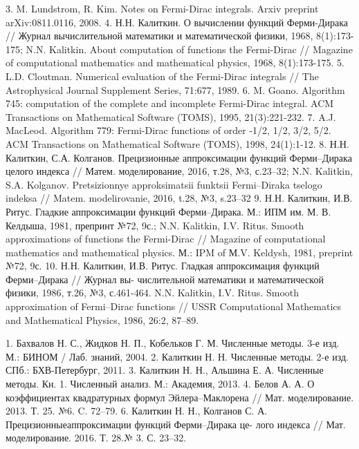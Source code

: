3. M. Lundstrom, R. Kim. Notes on Fermi-Dirac integrals. Arxiv preprint arXiv:0811.0116, 2008.
4. Н.Н. Калиткин. О вычислении функций Ферми-Дирака // Журнал вычислительной математики и математической физики, 1968, 8(1):173-175;
N.N. Kalitkin. About computation of functions the Fermi-Dirac // Magazine of computational
mathematics and mathematical physics, 1968, 8(1):173-175.
5. L.D. Cloutman. Numerical evaluation of the Fermi-Dirac integrals // The Astrophysical Journal
Supplement Series, 71:677, 1989.
6. M. Goano. Algorithm 745: computation of the complete and incomplete Fermi-Dirac integral.
ACM Transactions on Mathematical Software (TOMS), 1995, 21(3):221-232.
7. A.J. MacLeod. Algorithm 779: Fermi-Dirac functions of order -1/2, 1/2, 3/2, 5/2. ACM Transactions
on Mathematical Software (TOMS), 1998, 24(1):1-12.
8. Н.Н. Калиткин, С.А. Колганов. Прецизионные аппроксимации функций Ферми–Дирака целого индекса // Матем. моделирование, 2016, т.28, №3, с.23–32;
N.N. Kalitkin, S.A. Kolganov. Pretsizionnye approksimatsii funktsii Fermi–Diraka tselogo indeksa
// Matem. modelirovanie, 2016, t.28, №3, s.23–32
9. Н.Н. Калиткин, И.В. Ритус. Гладкие аппроксимации функций Ферми–Дирака. М.: ИПМ
им. М. В. Келдыша, 1981, препринт №72, 9с.;
N.N. Kalitkin, I.V. Ritus. Smooth approximations of functions the Fermi-Dirac // Magazine of computational
mathematics and mathematical physics. М.: IPM of М.V. Keldysh, 1981, preprint
№72, 9с.
10. Н.Н. Калиткин, И.В. Ритус. Гладкая аппроксимация функций Ферми–Дирака // Журнал вы-
числительной математики и математической физики, 1986, т.26, №3, с.461-464.
N.N. Kalitkin, I.V. Ritus. Smooth approximation of Fermi–Dirac functions // USSR Computational
Mathematics and Mathematical Physics, 1986, 26:2, 87–89.

1. Бахвалов Н. С., Жидков Н. П., Кобельков Г. М. Численные методы. 3-е изд. М.: БИНОМ / Лаб. знаний, 2004.
2. Калиткин Н. Н. Численные методы. 2-е изд. СПб.: БХВ-Петербург, 2011.
3. Калиткин Н. Н., Альшина Е. А. Численные методы. Кн. 1. Численный анализ. М.: Академия, 2013.
4. Белов А. А. О коэффициентах квадратурных формул Эйлера–Маклорена // Мат. моделирование. 2013. Т. 25. №6. C. 72–79.
6. Калиткин Н. Н., Колганов С. А. Прецизионныеаппроксимации функций Ферми–Дирака це-
лого индекса // Мат. моделирование. 2016. Т. 28.№ 3. С. 23–32.


